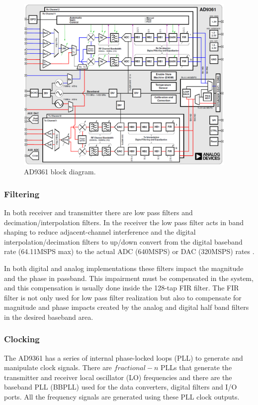 \begin{figure}[htbp]
    \centering
    \includegraphics[width=0.95\textwidth]{./figures/ad9361_block_diagram}
    \caption{ AD9361 block diagram.
    \label{fig:ad9361blk}}
\end{figure}

\subsubsection{Filtering}

In both receiver and transmitter there are low pass filters and
decimation/interpolation filters. In the receiver the low pass filter acts in
band shaping to reduce adjacent-channel interference and the digital
interpolation/decimation filters to up/down convert from the digital baseband
rate (64.11MSPS max) to the actual ADC (640MSPS) or DAC (320MSPS) rates \cite{web:ad9361wiki}.

In both digital and analog implementations these filters impact the magnitude
and the phase in passband. This impairment must be compensated in the system,
and this compensation is usually done inside the 128-tap FIR filter. The FIR
filter is not only used for low pass filter realization but also to compensate
for magnitude and phase impacts created by the analog and digital half band
filters in the desired baseband area.

\subsubsection{Clocking}

The AD9361 has a series of internal phase-locked loops (PLL) to generate and
manipulate clock signals. There are $fractional-n$ PLLs that generate the
transmitter and receiver local oscillator (LO) frequencies and there are the
baseband PLL (BBPLL) used for the data converters, digital filters and I/O
ports. All the frequency signals are generated using these PLL clock outputs.

